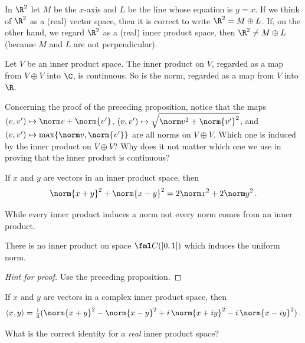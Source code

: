 \begin{exam} In $\R^2$ let $M$ be the $x$-axis and $L$ be the line whose equation is $y = x$.
If we think of $\R^2$ as a (real) vector space, then it is correct to write $\R^2 = M
\oplus L$.  If, on the other hand, we regard $\R^2$ as a (real) inner product space, then
$\R^2 \ne M \oplus L$ (because $M$ and $L$ are not perpendicular).
\end{exam}

\begin{prop}  Let $V$ be an inner product space.  The inner product on $V$, regarded as a map
from $V \oplus V$ into $\C$, is continuous. So is the norm, regarded as a map from $V$
into $\R$.
\end{prop}

Concerning the proof of the preceding proposition, notice that the maps $(v,v') \mapsto
\norm v + \norm{v'}$, $(v,v') \mapsto \sqrt{\norm v^2 + \norm{v'}^2}$, and $(v,v')
\mapsto \max\{\norm v, \norm{v'}\}$ are all norms on $V \oplus V$. Which one is induced
by the inner product on $V \oplus V$?  Why does it not matter which one we use in proving
that the inner product is continuous?

\begin{prop}\label{parallelogram_law}  If $x$ and $y$ are vectors in an inner product
space, then
   \[ \norm{x + y}^2 + \norm{x - y}^2 = 2\norm x^2 + 2\norm y^2\,. \]
\end{prop}

While every inner product induces a norm not every norm comes from an inner product.

\begin{exam}\label{00015061} There is no inner product on space $\fml C([0,1])$ which induces the uniform norm.
\end{exam}

\begin{proof}[\emph{Hint for proof}] Use the preceding proposition. \ns
\end{proof}

\begin{prop}\label{0001507} If $x$ and $y$ are vectors
in a complex inner product space, then
 \[ \langle x,y \rangle = \tfrac14 (\norm{x + y}^2 - \norm{x - y}^2
                       + i\,\norm{x + iy}^2 - i\,\norm{x - iy}^2)\,. \]
\end{prop}

What is the correct identity for a \emph{real} inner product space?

